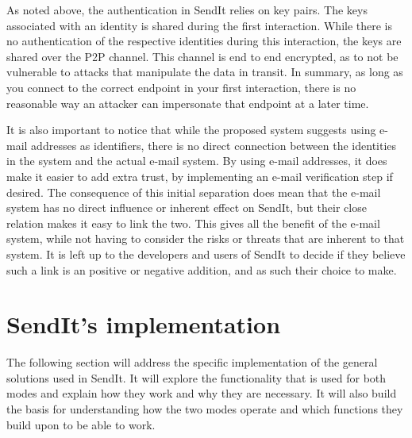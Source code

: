 		As noted above, the authentication in SendIt relies on key pairs. The keys associated with an identity is shared during the first interaction. While there is no authentication of the respective identities during this interaction, the keys are shared over the P2P channel. This channel is end to end encrypted, as to not be vulnerable to attacks that manipulate the data in transit. In summary, as long as you connect to the correct endpoint in your first interaction, there is no reasonable way an attacker can impersonate that endpoint at a later time.

		It is also important to notice that while the proposed system suggests using e-mail addresses as identifiers, there is no direct connection between the identities in the system and the actual e-mail system. By using e-mail addresses, it does make it easier to add extra trust, by implementing an e-mail verification step if desired. The consequence of this initial separation does mean that the e-mail system has no direct influence or inherent effect on SendIt, but their close relation makes it easy to link the two. This gives all the benefit of the e-mail system, while not having to consider the risks or threats that are inherent to that system. It is left up to the developers and users of SendIt to decide if they believe such a link is an positive or negative addition, and as such their choice to make.

%			
\section{SendIt's implementation}
The following section will address the specific implementation of the general solutions used in SendIt. It will explore the functionality that is used for both modes and explain how they work and why they are necessary. It will also build the basis for understanding how the two modes operate and which functions they build upon to be able to work.

